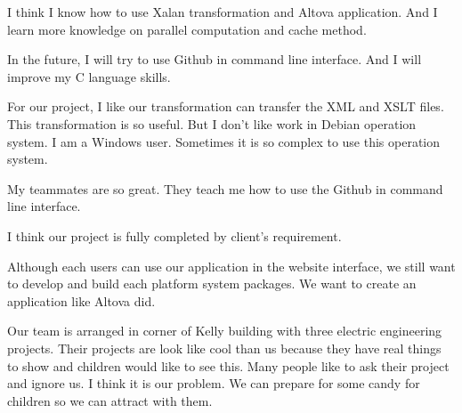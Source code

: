 I think I know how to use Xalan transformation and Altova application. And I learn more knowledge on parallel computation and cache method.

In the future, I will try to use Github in command line interface. And I will improve my C language skills.

For our project, I like our transformation can transfer the XML and XSLT files. This transformation is so useful. But I don't like work in Debian operation system. I am a Windows user. Sometimes it is so complex to use this operation system.

My teammates are so great. They teach me how to use the Github in command line interface.

I think our project is fully completed by client's requirement.

Although each users can use our application in the website interface, we still want to develop and build each platform system packages. We want to create an application like Altova did.

Our team is arranged in corner of Kelly building with three electric engineering projects. Their projects are look like cool than us because they have real things to show and children would like to see this. Many people like to ask their project and ignore us. I think it is our problem. We can prepare for some candy for children so we can attract with them.
